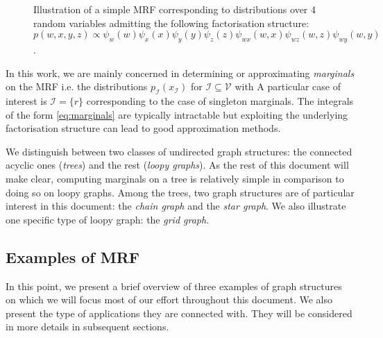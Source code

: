 \begin{figure}[!h]
\center
{}
\caption{\label{fig:simple-MRF}Illustration of a simple MRF corresponding to distributions over 4 random variables admitting the following factorisation structure:\\ $p(w,x,y,z)\propto \psi_{w}(w)\psi_{x}(x)\psi_{y}(y)\psi_{z}(z)\psi_{wx}(w,x)\psi_{wz}(w,z)\psi_{wy}(w,y)$.}
\end{figure}
In this work, we are mainly concerned in determining or approximating  \emph{marginals} on the MRF i.e. the distributions $p_{\mathcal I}(x_{\mathcal I})$ for $\mathcal I\subseteq\mathcal V$  with
A particular case of interest is $\mathcal I=\{r\}$ corresponding to the case of singleton marginals. The integrals of the form \eqref{eq:marginals} are typically intractable but exploiting the underlying factorisation structure can lead to good approximation methods.

We distinguish between two classes of undirected graph structures: the connected acyclic ones (\emph{trees}) and the rest (\emph{loopy graphs}). As the rest of this document will make clear, computing marginals on a tree is relatively simple in comparison to doing so on loopy graphs. 
Among the trees, two graph structures are of particular interest in this document: the \emph{chain graph} and the \emph{star graph}. 
We also illustrate one specific type of loopy graph: the \emph{grid graph}.


\subsection{\label{intro:exMRF}Examples of MRF}
In this point, we present a brief overview of three examples of graph structures on which we will focus most of our effort throughout this document. 
We also present the type of applications they are connected with. 
They will be considered in more details in subsequent sections.

